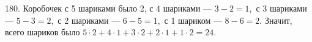 180. Коробочек с 5 шариками было 2, с 4 шариками --- $3-2=1,$ с 3 шариками --- $5-3=2,$ с 2 шариками --- $6-5=1,$ с 1 шариком --- $8-6=2.$ Значит, всего шариков было $5\cdot2+4\cdot1+3\cdot2+2\cdot1+1\cdot2=24.$\\
